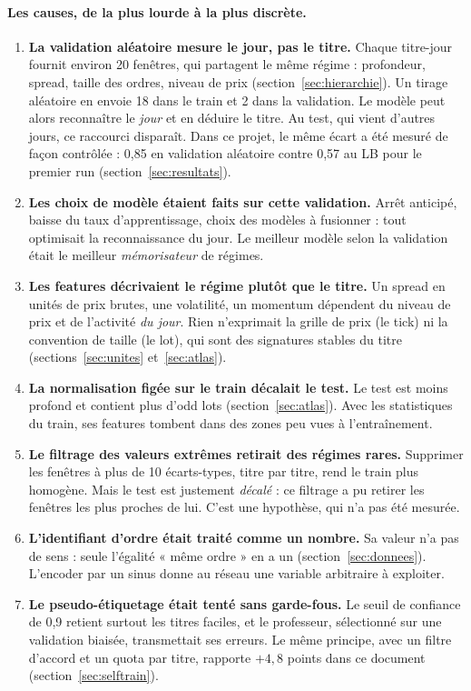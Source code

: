 \paragraph{Les causes, de la plus lourde à la plus discrète.}
\begin{enumerate}
\item \textbf{La validation aléatoire mesure le jour, pas le titre.} Chaque titre-jour fournit environ 20 fenêtres, qui partagent le même régime : profondeur, spread, taille des ordres, niveau de prix (section~\ref{sec:hierarchie}). Un tirage aléatoire en envoie 18 dans le train et 2 dans la validation. Le modèle peut alors reconnaître le \emph{jour} et en déduire le titre. Au test, qui vient d'autres jours, ce raccourci disparaît. Dans ce projet, le même écart a été mesuré de façon contrôlée : 0,85 en validation aléatoire contre 0,57 au LB pour le premier run (section~\ref{sec:resultats}).
\item \textbf{Les choix de modèle étaient faits sur cette validation.} Arrêt anticipé, baisse du taux d'apprentissage, choix des modèles à fusionner : tout optimisait la reconnaissance du jour. Le meilleur modèle selon la validation était le meilleur \emph{mémorisateur} de régimes.
\item \textbf{Les features décrivaient le régime plutôt que le titre.} Un spread en unités de prix brutes, une volatilité, un momentum dépendent du niveau de prix et de l'activité \emph{du jour}. Rien n'exprimait la grille de prix (le tick) ni la convention de taille (le lot), qui sont des signatures stables du titre (sections~\ref{sec:unites} et~\ref{sec:atlas}).
\item \textbf{La normalisation figée sur le train décalait le test.} Le test est moins profond et contient plus d'odd lots (section~\ref{sec:atlas}). Avec les statistiques du train, ses features tombent dans des zones peu vues à l'entraînement.
\item \textbf{Le filtrage des valeurs extrêmes retirait des régimes rares.} Supprimer les fenêtres à plus de 10 écarts-types, titre par titre, rend le train plus homogène. Mais le test est justement \emph{décalé} : ce filtrage a pu retirer les fenêtres les plus proches de lui. C'est une hypothèse, qui n'a pas été mesurée.
\item \textbf{L'identifiant d'ordre était traité comme un nombre.} Sa valeur n'a pas de sens : seule l'égalité « même ordre » en a un (section~\ref{sec:donnees}). L'encoder par un sinus donne au réseau une variable arbitraire à exploiter.
\item \textbf{Le pseudo-étiquetage était tenté sans garde-fous.} Le seuil de confiance de 0,9 retient surtout les titres faciles, et le professeur, sélectionné sur une validation biaisée, transmettait ses erreurs. Le même principe, avec un filtre d'accord et un quota par titre, rapporte $+4{,}8$ points dans ce document (section~\ref{sec:selftrain}).
\end{enumerate}


